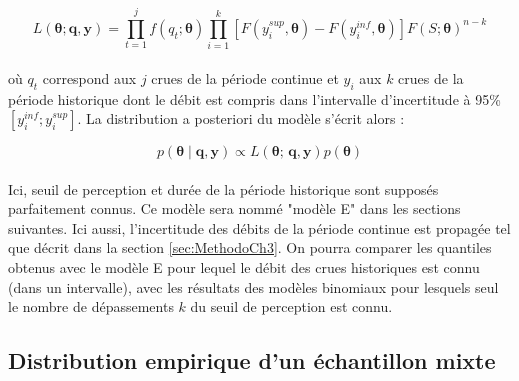 \documentclass[11pt]{article}
\begin{document}
		\begin{equation}
					L(\boldsymbol{\theta} ; \boldsymbol{q}, \boldsymbol{y}) =\prod_{t=1}^j f\left(q_t;\boldsymbol{\theta}\right) \prod_{i=1}^k \left[F(y_{i}^{sup},\boldsymbol{\theta} ) - F(y_i^{inf},\boldsymbol{\theta})\right]  F\left(S;\boldsymbol{\theta}\right)^{n-k}
		\label{eq:Censure}
		\end{equation}
					
		\paragraph{}où $q_t$ correspond aux $j$ crues de la période continue et $y_i$ aux $k$ crues de la période historique dont le débit est compris dans l'intervalle d'incertitude à 95\% $\left[y_i^{inf} ; y_i^{sup}\right]$. La distribution a posteriori du modèle s'écrit alors : 
				
		\begin{equation}
			p(\boldsymbol{\theta} \mid \boldsymbol{q},\boldsymbol{y}) \propto L(\boldsymbol{\theta};\,\boldsymbol{q},\boldsymbol{y})p(\boldsymbol{\theta})
		\label{eq:Bayes_Censure}
		\end{equation}

	\paragraph{} Ici, seuil de perception et durée de la période historique sont supposés parfaitement connus. Ce modèle sera nommé "modèle E" dans les sections suivantes. Ici aussi, l'incertitude des débits de la période continue est propagée tel que décrit dans la section \ref{sec:MethodoCh3}. On pourra comparer les quantiles obtenus avec le modèle E pour lequel le débit des crues historiques est connu (dans un intervalle), avec les résultats des modèles binomiaux pour lesquels seul le nombre de dépassements $k$ du seuil de perception est connu.
	

	\subsection{Distribution empirique d'un échantillon mixte}
	\label{subsec:DistEmpirique}
	
\end{document}
